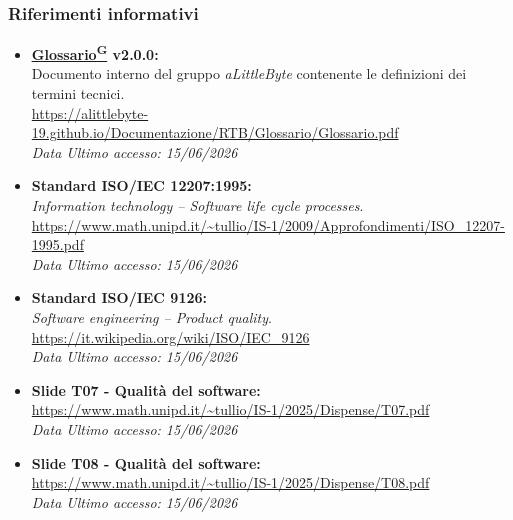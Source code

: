 \documentclass[a4paper,12pt]{article}
\providecommand{\glslink}[2]{\href{https://alittlebyte-19.github.io/Documentazione/glossario.html\#gls-#1}{\underline{#2}\textsuperscript{\scriptsize G}}}
\begin{document}
\subsubsection{Riferimenti informativi}
\begin{itemize}
    \item \textbf{\glslink{glossario}{Glossario} v2.0.0:}\\
    Documento interno del gruppo \textit{aLittleByte} contenente le definizioni dei termini tecnici.\\
    \url{https://alittlebyte-19.github.io/Documentazione/RTB/Glossario/Glossario.pdf}\\
    \textit{Data Ultimo accesso: 15/06/2026}

    \item \textbf{Standard ISO/IEC 12207:1995:}\\
    \textit{Information technology -- Software life cycle processes}.\\
    \url{https://www.math.unipd.it/~tullio/IS-1/2009/Approfondimenti/ISO_12207-1995.pdf}\\
    \textit{Data Ultimo accesso: 15/06/2026}

    \item \textbf{Standard ISO/IEC 9126:}\\
    \textit{Software engineering -- Product quality}.\\
    \url{https://it.wikipedia.org/wiki/ISO/IEC_9126}\\
    \textit{Data Ultimo accesso: 15/06/2026}

    \item \textbf{Slide T07 - Qualità del software:}\\
    \url{https://www.math.unipd.it/~tullio/IS-1/2025/Dispense/T07.pdf}\\
    \textit{Data Ultimo accesso: 15/06/2026}

    \item \textbf{Slide T08 - Qualità del software:}\\
    \url{https://www.math.unipd.it/~tullio/IS-1/2025/Dispense/T08.pdf}\\
    \textit{Data Ultimo accesso: 15/06/2026}
\end{itemize}
\end{document}
